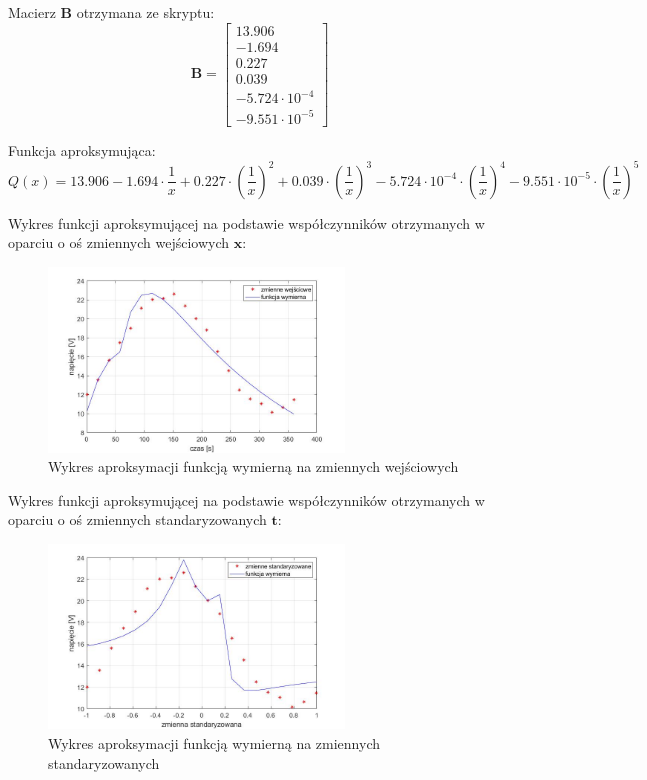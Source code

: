 \documentclass[a4paper, 12pt]{mwart}
\begin{document}
				Macierz $\textbf{B}$ otrzymana ze skryptu:
				$$\textbf{B} = \begin{bmatrix}
					13.906\\
					-1.694\\
					0.227\\
					0.039\\
					-5.724 \cdot 10^{-4}\\
					-9.551 \cdot 10^{-5}
				\end{bmatrix}$$
				
				Funkcja aproksymująca:
				$$Q(x) = 13.906 - 1.694\cdot \frac{1}{x} + 0.227\cdot
				\left(\frac{1}{x}\right)^2 + 0.039\cdot \left(\frac{1}{x}\right)^3 
				 -5.724\cdot 10^{-4}\cdot \left(\frac{1}{x}\right)^4   -9.551 \cdot 10^{-5}\cdot 
				 \left(\frac{1}{x}\right)^5$$

			\newpage
				Wykres funkcji aproksymującej na podstawie współczynników otrzymanych w oparciu
				o oś zmiennych wejściowych $\textbf{x}$:
				\begin{figure}[h]
					\begin{center}
						\includegraphics[width = 0.7\textwidth]{graphs/5-n.jpg}
						\caption{Wykres aproksymacji funkcją wymierną na zmiennych wejściowych}
						\label{fig:5n}
					\end{center}
				\end{figure}

				Wykres funkcji aproksymującej na podstawie współczynników otrzymanych w oparciu
				o oś zmiennych standaryzowanych $\textbf{t}$:
				\begin{figure}[h]
					\begin{center}
						\includegraphics[width = 0.7\textwidth]{graphs/5-s.jpg}
						\caption{Wykres aproksymacji funkcją wymierną na zmiennych standaryzowanych}
						\label{fig:5s}
					\end{center}
				\end{figure}
\end{document}
